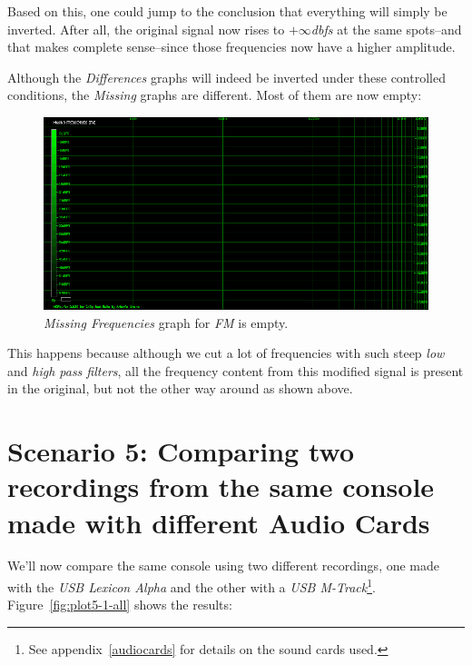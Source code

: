 \documentclass[10pt,a4paper]{report}
\newcommand{\db}[1]{\textit{\mbox{#1\acrshort{dbfs}}}}
\begin{document}
Based on this, one could jump to the conclusion that everything will simply be inverted. After all, the original signal now rises to \db{$+\infty$} at the same spots--and that makes complete sense--since those frequencies now have a higher amplitude. 

Although the \textit{Differences} graphs will indeed be inverted under these controlled conditions, the \textit{Missing} graphs are different. Most of them are now empty:

\begin{figure}[H]
	\centering
	\includegraphics[width=1.0\linewidth]{images/interpretation/Plot4-8-Missing-FM-Inverted.png}
	\caption[Reversed FM Missing]{\textit{Missing Frequencies} graph for \textit{FM} is empty.}
	\label{fig:plot4-8-missing-fm-inverted}
\end{figure}

This happens because although we cut a lot of frequencies with such steep \textit{low} and \textit{high pass filters}, all the frequency content from this modified signal is present in the original, but not the other way around as shown above.

\section{Scenario 5: Comparing two recordings from the same console made with different Audio Cards}

We'll now compare the same console using two different recordings, one made with the \textit{USB Lexicon Alpha} and the other with a \textit{USB M-Track}\footnote{See appendix~\ref{audiocards} for details on the sound cards used.}. Figure~\ref{fig:plot5-1-all} shows the results:
\end{document}
